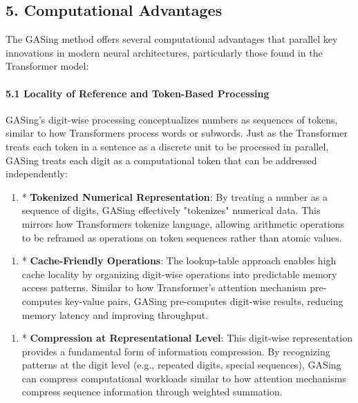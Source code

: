 \subsection{5. Computational Advantages}
The GASing method offers several computational advantages that parallel key innovations in modern neural architectures, particularly those found in the Transformer model:

\paragraph{5.1 Locality of Reference and Token-Based Processing}
GASing's digit-wise processing conceptualizes numbers as sequences of tokens, similar to how Transformers process words or subwords. Just as the Transformer treats each token in a sentence as a discrete unit to be processed in parallel, GASing treats each digit as a computational token that can be addressed independently:

\begin{enumerate}
  \item * \textbf{Tokenized Numerical Representation}: By treating a number as a sequence of digits, GASing effectively "tokenizes" numerical data. This mirrors how Transformers tokenize language, allowing arithmetic operations to be reframed as operations on token sequences rather than atomic values.
\end{enumerate}

\begin{enumerate}
  \item * \textbf{Cache-Friendly Operations}: The lookup-table approach enables high cache locality by organizing digit-wise operations into predictable memory access patterns. Similar to how Transformer's attention mechanism pre-computes key-value pairs, GASing pre-computes digit-wise results, reducing memory latency and improving throughput.
\end{enumerate}

\begin{enumerate}
  \item * \textbf{Compression at Representational Level}: This digit-wise representation provides a fundamental form of information compression. By recognizing patterns at the digit level (e.g., repeated digits, special sequences), GASing can compress computational workloads similar to how attention mechanisms compress sequence information through weighted summation.
\end{enumerate}

